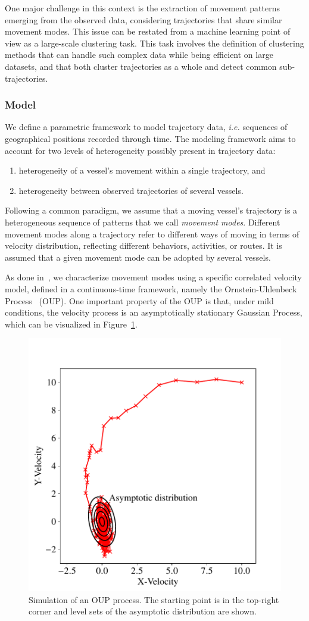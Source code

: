 One major challenge in this context is the extraction of movement patterns
emerging from the observed data, considering trajectories that share similar
movement modes.
This issue can be restated from a machine learning point of view as a
large-scale clustering task.
This task involves the definition of clustering methods
that can handle such complex data while being efficient on large datasets,
and that both cluster trajectories as a whole and detect common
sub-trajectories.

\subsubsection{Model}

We define a parametric framework to model trajectory data,
\emph{i.e.} sequences of geographical positions recorded through time.
The modeling framework aims to account for two levels of heterogeneity possibly
present in trajectory data:

\begin{enumerate}
\item heterogeneity of a vessel's movement within a single trajectory, and
\item heterogeneity between observed trajectories of several vessels.
\end{enumerate}

Following a common paradigm, we assume that a moving vessel's trajectory
is a heterogeneous sequence of patterns that we call \emph{movement modes}.
Different movement modes along a trajectory refer to different ways of moving
in terms of velocity distribution, reflecting different behaviors, activities,
or routes.
It is assumed that a given movement mode can be adopted by several vessels.

As done in~\cite{gurarie2017correlated}, we characterize
movement modes using a specific correlated velocity model, defined in a
continuous-time framework, namely the Ornstein-Uhlenbeck
Process~\cite{uhlenbeck1930theory} (OUP).
One important property of the OUP is that, under mild conditions,
the velocity process is an asymptotically stationary Gaussian Process, which
can be visualized in Figure~\ref{fig:oup}.

\begin{figure}
\centering
\includegraphics[width=.5\textwidth]{fig/oup}
\caption{Simulation of an OUP process. The starting point is in the
top-right corner and level sets of the asymptotic distribution are shown.
\label{fig:oup}}
\end{figure}


